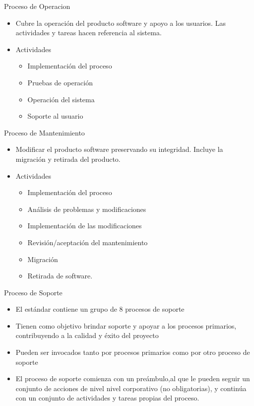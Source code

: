 \documentclass{beamer}
\begin{document}
			\begin{frame}{Proceso de Operacion}
				\begin{itemize}
					\item Cubre la operación del producto software y apoyo a los usuarios. Las actividades y tareas hacen referencia al sistema.
					\item Actividades
					\begin{itemize}
						\item Implementación del proceso
						\item Pruebas de operación
						\item Operación del sistema
						\item Soporte al usuario 
					\end{itemize}
				\end{itemize}
			\end{frame}
			
			\begin{frame}{Proceso de Mantenimiento}
				\begin{itemize}
					\item Modificar el producto software preservando su integridad. Incluye la migración y retirada del producto.
					\item Actividades
					\begin{itemize}
						\item Implementación del proceso
						\item Análisis de problemas y modificaciones
						\item Implementación de las modificaciones
						\item Revisión/aceptación del mantenimiento
						\item Migración
						\item Retirada de software.
					\end{itemize}
				\end{itemize}
			\end{frame}
			
			\begin{frame}{Proceso de Soporte}
				\begin{itemize}
					\item El estándar contiene un grupo de 8 procesos de soporte
					\item Tienen como objetivo brindar soporte y apoyar a los procesos primarios, contribuyendo a la calidad y éxito del proyecto
					\item Pueden ser invocados tanto por procesos primarios como por otro proceso de soporte
					\item El proceso de soporte comienza con un preámbulo,al que le pueden seguir un conjunto de acciones de nivel nivel corporativo (no obligatorias), y continúa con un conjunto de actividades y tareas propias del proceso.
				\end{itemize}
			\end{frame}
			
\end{document}
